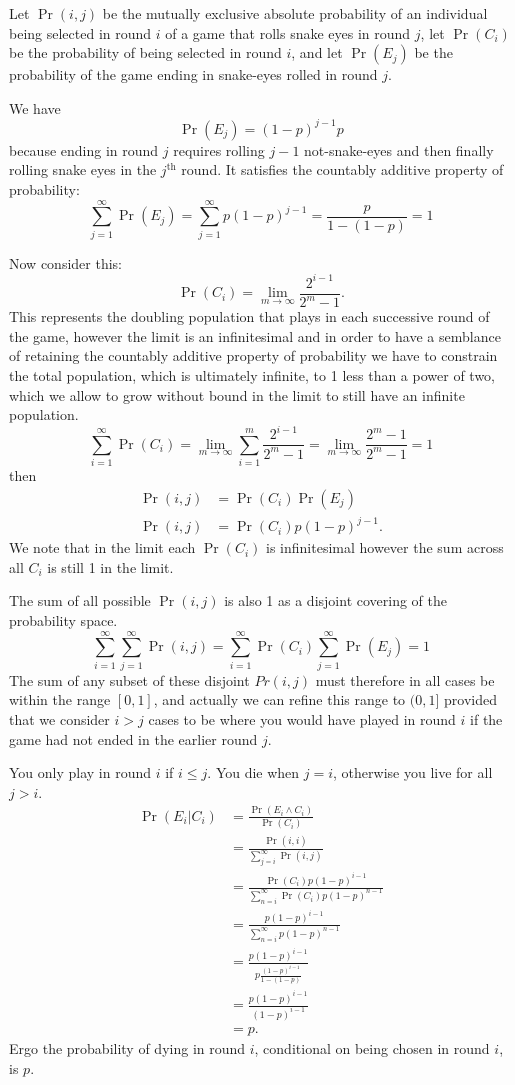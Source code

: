 \documentclass[article,twocolumn]{memoir}
\begin{document}
Let $\Pr(i,j)$ be the mutually exclusive absolute probability of an individual being selected in round $i$ of a game that rolls snake eyes in round $j$, 
let $\Pr(C_i)$ be the probability of being selected in round $i$, and 
let $\Pr(E_j)$ be the probability of the game ending in snake-eyes rolled in round $j$.

We have
$$\Pr(E_j) = (1-p)^{j-1}p$$
because ending in round $j$ requires rolling $j-1$ not-snake-eyes and then finally rolling snake eyes in the $j^\text{th}$ round.
It satisfies the countably additive property of probability:
$$\sum_{j=1}^\infty \Pr(E_j) =\sum_{j=1}^\infty p(1-p)^{j-1}= \frac{p}{1-(1-p)}=1$$

Now consider this:
$$\Pr(C_i) = \lim_{m\to\infty}\frac{2^{i-1}}{2^m-1}.$$
This represents the doubling population that plays in each successive round of the game, however the limit is an infinitesimal and in order to have a semblance of retaining the countably additive property of probability we have to constrain the total population, which is ultimately infinite, to 1 less than a power of two, which we allow to grow without bound in the limit to still have an infinite population.
$$\sum_{i=1}^\infty \Pr(C_i) = \lim_{m\to\infty}\sum_{i=1}^m\frac{2^{i-1}}{2^m-1}=\lim_{m\to\infty}\frac{2^m-1}{2^m-1}=1$$
then
\begin{align*}
\Pr(i,j) & = \Pr(C_i)\Pr(E_j)\\
\Pr(i,j) & = \Pr(C_i)p(1-p)^{j-1}.
\end{align*}
We note that in the limit each $\Pr(C_i)$ is infinitesimal however the sum across all $C_i$ is still 1 in the limit.
        
The sum of all possible $\Pr(i,j)$ is also 1 as a disjoint covering of the probability space.
$$\sum_{i=1}^\infty\sum_{j=1}^\infty \Pr(i,j) =\sum_{i=1}^\infty \Pr(C_i)\sum_{j=1}^\infty\Pr(E_j) = 1$$
The sum of any subset of these disjoint $Pr(i,j)$ must therefore in all cases be within the range $[0,1]$, and actually we can refine this range to $(0,1]$ provided that we consider $i>j$ cases to be where you would have played in round $i$ if the game had not ended in the earlier round $j$.

You only play in round $i$ if $i\leq j$.
You die when $j=i$, otherwise you live for all $j>i$.
\begin{align*}
\Pr(E_i|C_i)&=\frac{\Pr(E_i\land C_i)}{\Pr(C_i)}\\ 
&=\frac{\Pr(i,i)}{\sum_{j=i}^\infty \Pr(i,j)}\\
&=\frac{\Pr(C_i)p(1-p)^{i-1}}{\sum_{n=i}^{\infty} \Pr(C_i)p(1-p)^{n-1}}\\
&=\frac{p(1-p)^{i-1}}{\sum_{n=i}^{\infty}p(1-p)^{n-1}}\\
&=\frac{p(1-p)^{i-1}}{p\frac{(1-p)^{i-1}}{1-(1-p)}}\\
&=\frac{p(1-p)^{i-1}}{(1-p)^{i-1}}\\
&=p.
\end{align*}
Ergo the probability of dying in round $i$, conditional on being chosen in round $i$, is $p$.
\end{document}
